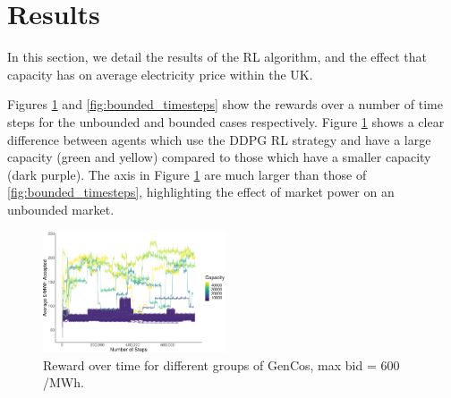 \documentclass[conference]{IEEEtran}
\begin{document}







\section{Results}
\label{sec:results}

In this section, we detail the results of the RL algorithm, and the effect that capacity has on average electricity price within the UK.

Figures \ref{fig:unbounded_timesteps} and \ref{fig:bounded_timesteps} show the rewards over a number of time steps for the unbounded and bounded cases respectively. Figure \ref{fig:unbounded_timesteps} shows a clear difference between agents which use the DDPG RL strategy and have a large capacity (green and yellow) compared to those which have a smaller capacity (dark purple). The axis in Figure \ref{fig:unbounded_timesteps} are much larger than those of \ref{fig:bounded_timesteps}, highlighting the effect of market power on an unbounded market.


\begin{figure}[htbp]
    \includegraphics[width=0.48\textwidth]{figures/results/unbounded_results.pdf}
    \caption{Reward over time for different groups of GenCos, max bid = \textsterling $600$/MWh.}
    \label{fig:unbounded_timesteps}
\end{figure}
\end{document}
